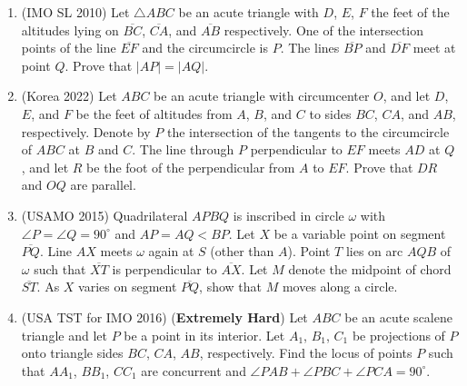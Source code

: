 \documentclass[12pt]{scrartcl}
\begin{document}
\begin{enumerate}
\item (IMO SL 2010) Let $\triangle ABC$ be an acute triangle with $D$, $E$, $F$ the feet of the altitudes lying on $\overline{BC}$, $\overline{CA}$, and $\overline{AB}$ respectively. One of the intersection points of the line $\overline{EF}$ and the circumcircle is $P$. The lines $\overline{BP}$ and $\overline{DF}$ meet at point $Q$. Prove that $|AP| = |AQ|$.

\item (Korea 2022) Let $ABC$ be an acute triangle with circumcenter $O$, and let $D$, $E$, and $F$ be the feet of altitudes from $A$, $B$, and $C$ to sides $BC$, $CA$, and $AB$, respectively. Denote by $P$ the intersection of the tangents to the circumcircle of $ABC$ at $B$ and $C$. The line through $P$ perpendicular to $EF$ meets $AD$ at $Q$, and let $R$ be the foot of the perpendicular from $A$ to $EF$. Prove that $DR$ and $OQ$ are parallel.

\item (USAMO 2015) Quadrilateral $APBQ$ is inscribed in circle $\omega$ with $\angle P = \angle Q = 90^{\circ}$ and $AP = AQ < BP$. Let $X$ be a variable point on segment $\overline{PQ}$. Line $AX$ meets $\omega$ again at $S$ (other than $A$). Point $T$ lies on arc $AQB$ of $\omega$ such that $\overline{XT}$ is perpendicular to $\overline{AX}$. Let $M$ denote the midpoint of chord $\overline{ST}$. As $X$ varies on segment $\overline{PQ}$, show that $M$ moves along a circle.

\item (USA TST for IMO 2016) (\textbf{Extremely Hard}) Let $ABC$ be an acute scalene triangle and let $P$ be a point in its interior. Let $A_1$, $B_1$, $C_1$ be projections of $P$ onto triangle sides $BC$, $CA$, $AB$, respectively. Find the locus of points $P$ such that $AA_1$, $BB_1$, $CC_1$ are concurrent and $\angle PAB + \angle PBC + \angle PCA = 90^{\circ}$.
 \end{enumerate}
 
\end{document}
